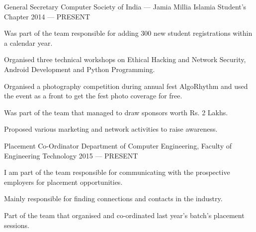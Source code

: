 
\begin{cventries}

  \cventry%
    {General Secretary} %
    {Computer Society of India --- Jamia Millia Islamia Student's Chapter} %
    {} %
    {2014 --- PRESENT} %
    {%
      \begin{cvitems} %
        \item{Was part of the team responsible for adding 300 new student registrations within a calendar year.}
        \item{Organised three technical workshops on Ethical Hacking and Network Security, Android Development and Python Programming.}
        \item{Organised a photography competition during annual fest AlgoRhythm and used the event as a front to get the fest photo coverage for free.}
        \item{Was part of the team that managed to draw sponsors worth Rs. 2 Lakhs.}
        \item{Proposed various marketing and network activities to raise awareness.}
      \end{cvitems}
    }

  \cventry%
    {Placement Co-Ordinator} %
    {Department of Computer Engineering, Faculty of Engineering Technology} %
    {} %
    {2015 --- PRESENT} %
    {%
      \begin{cvitems} %
        \item {I am part of the team responsible for communicating with the prospective employers for placement opportunities.}
        \item {Mainly responsible for finding connections and contacts in the industry.}
        \item {Part of the team that organised and co-ordinated last year's batch's placement sessions.}
      \end{cvitems}
    }


\end{cventries}
